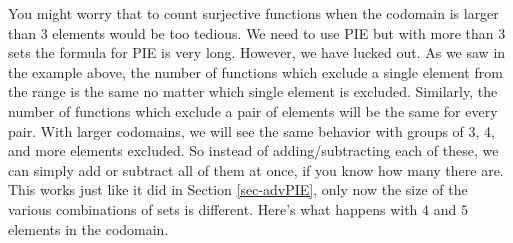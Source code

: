 \documentclass[12pt]{article}
\begin{document}
You might worry that to count surjective functions when the codomain is larger than 3 elements would be too tedious.  We need to use PIE but with more than 3 sets the formula for PIE is very long.  However, we have lucked out.  As we saw in the example above, the number of functions which exclude a single element from the range is the same no matter which single element is excluded.  Similarly, the number of functions which exclude a pair of elements will be the same for every pair.  With larger codomains, we will see the same behavior with groups of 3, 4, and more elements excluded.  So instead of adding/subtracting each of these, we can simply add or subtract all of them at once, if you know how many there are.  This works just like it did in Section \ref{sec-advPIE}, only now the size of the various combinations of sets is different.  Here's what happens with $4$ and $5$ elements in the codomain.
\end{document}
